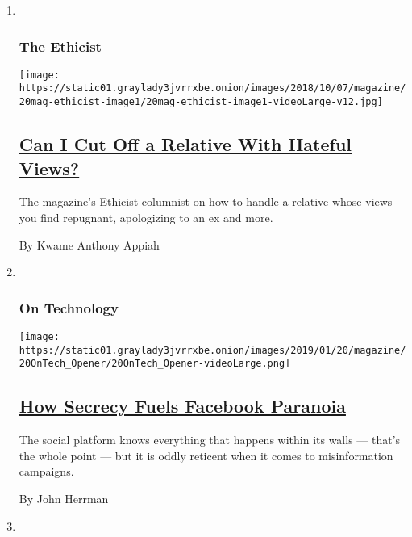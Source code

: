 \begin{enumerate}
\def\labelenumi{\arabic{enumi}.}
\item ~
  \hypertarget{the-ethicist}{%
  \subsubsection{The Ethicist}\label{the-ethicist}}

  \texttt{[image: https://static01.graylady3jvrrxbe.onion/images/2018/10/07/magazine/20mag-ethicist-image1/20mag-ethicist-image1-videoLarge-v12.jpg]}

  \hypertarget{can-i-cut-off-a-relative-with-hateful-views}{%
  \subsection{\texorpdfstring{\href{/2019/01/15/magazine/can-i-cut-off-a-relative-with-hateful-views.html}{Can
  I Cut Off a Relative With Hateful
  Views?}}{Can I Cut Off a Relative With Hateful Views?}}\label{can-i-cut-off-a-relative-with-hateful-views}}

  The magazine's Ethicist columnist on how to handle a relative whose
  views you find repugnant, apologizing to an ex and more.

  By Kwame Anthony Appiah
\item ~
  \hypertarget{on-technology}{%
  \subsubsection{On Technology}\label{on-technology}}

  \texttt{[image: https://static01.graylady3jvrrxbe.onion/images/2019/01/20/magazine/20OnTech\_Opener/20OnTech\_Opener-videoLarge.png]}

  \hypertarget{how-secrecy-fuels-facebook-paranoia}{%
  \subsection{\texorpdfstring{\href{/2019/01/16/magazine/facebook-election-analytics.html}{How
  Secrecy Fuels Facebook
  Paranoia}}{How Secrecy Fuels Facebook Paranoia}}\label{how-secrecy-fuels-facebook-paranoia}}

  The social platform knows everything that happens within its walls ---
  that's the whole point --- but it is oddly reticent when it comes to
  misinformation campaigns.

  By John Herrman
\item ~
  \hypertarget{first-words}{%
}
\end{enumerate}
